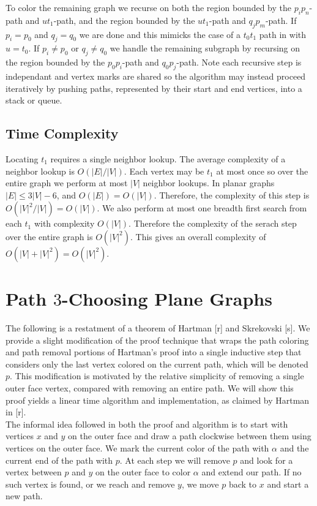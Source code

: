 \documentclass[11pt,letter]{article}
\begin{document}
\noindent To color the remaining graph we recurse on both the region
bounded by the $p_ip_n$-path and $ut_1$-path, and the region bounded by the $ut_1$-path and $q_jp_m$-path.
If $p_i=p_0$ and $q_j=q_0$ we are done and this mimicks the case of a $t_0t_1$ path in with $u=t_0$.
If $p_i\ne p_0$ or $q_j\ne q_0$ we handle the remaining subgraph by recursing on the region bounded by the
$p_0p_i$-path and $q_0p_j$-path. Note each recursive step is independant and vertex marks are shared so the
algorithm may instead proceed iteratively by pushing paths, represented by their start and end
vertices, into a stack or queue.

\subsection*{Time Complexity}

\noindent Locating $t_1$ requires a single neighbor lookup. The average complexity of a neighbor lookup is
$O(|E|/|V|)$. Each vertex may be $t_1$ at most once so over the entire graph we perform at most $|V|$ neighbor
lookups. In planar graphs $|E|\le 3|V|-6$, and $O(|E|)=O(|V|)$. Therefore, the
complexity of this step is $O(|V|^2/|V|)=O(|V|)$. We also perform at most one breadth first
search from each $t_1$ with complexity $O(|V|)$. Therefore the complexity of the serach step over the
entire graph is $O(|V|^2)$. This gives an overall complexity of $O(|V|+|V|^2)=O(|V|^2)$.

\section{Path $3$-Choosing Plane Graphs}

The following is a restatment of a theorem of Hartman [r] and Skrekovski [s]. We provide a slight modification of
the proof technique that wraps the path coloring and path removal portions of Hartman's proof into a single inductive
step that considers only the last vertex colored on the current path, which will be denoted $p$.
This modification is motivated by the relative simplicity of removing a single outer face vertex,
compared with removing an entire path.
We will show this proof yields a linear time algorithm and implementation, as claimed by Hartman in [r].\\

\noindent The informal idea followed in both the proof and algorithm is to start with
vertices $x$ and $y$ on the outer face and draw a path clockwise between them using vertices on the outer face.
We mark the current color of the path with $\alpha$ and the current end of the path with $p$. At each step we will remove
$p$ and look for a vertex between $p$ and $y$ on the outer face to color $\alpha$ and extend our path. If no
such vertex is found, or we reach and remove $y$, we move $p$ back to $x$ and start a new path.\\
\end{document}
